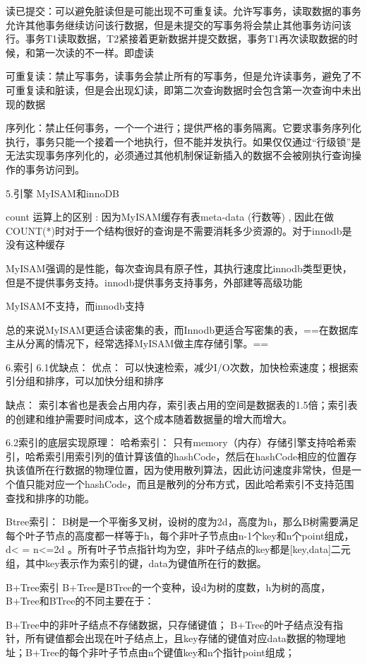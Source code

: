 \documentclass[UTF8]{ctexart}
\begin{document}
读已提交：可以避免脏读但是可能出现不可重复读。允许写事务，读取数据的事务允许其他事务继续访问该行数据，但是未提交的写事务将会禁止其他事务访问该行。事务T1读取数据，T2紧接着更新数据并提交数据，事务T1再次读取数据的时候，和第一次读的不一样。即虚读

可重复读：禁止写事务，读事务会禁止所有的写事务，但是允许读事务，避免了不可重复读和脏读，但是会出现幻读，即第二次查询数据时会包含第一次查询中未出现的数据

序列化：禁止任何事务，一个一个进行；提供严格的事务隔离。它要求事务序列化执行，事务只能一个接着一个地执行，但不能并发执行。如果仅仅通过“行级锁”是无法实现事务序列化的，必须通过其他机制保证新插入的数据不会被刚执行查询操作的事务访问到。

5.引擎
MyISAM和innoDB

count 运算上的区别 : 因为MyISAM缓存有表meta-data (行数等) , 因此在做COUNT(*)时对于一个结构很好的查询是不需要消耗多少资源的。对于innodb是没有这种缓存

MyISAM强调的是性能，每次查询具有原子性，其执行速度比innodb类型更快，但是不提供事务支持。innodb提供事务支持事务，外部建等高级功能

MyISAM不支持，而innodb支持

总的来说MyISAM更适合读密集的表，而Innodb更适合写密集的表，==在数据库主从分离的情况下，经常选择MyISAM做主库存储引擎。==

6.索引
6.1优缺点：
优点： 可以快速检索，减少I/O次数，加快检索速度；根据索引分组和排序，可以加快分组和排序

缺点： 索引本省也是表会占用内存，索引表占用的空间是数据表的1.5倍；索引表的创建和维护需要时间成本，这个成本随着数据量的增大而增大。

6.2索引的底层实现原理：
哈希索引：
只有memory（内存）存储引擎支持哈希索引，哈希索引用索引列的值计算该值的hashCode，然后在hashCode相应的位置存执该值所在行数据的物理位置，因为使用散列算法，因此访问速度非常快，但是一个值只能对应一个hashCode，而且是散列的分布方式，因此哈希索引不支持范围查找和排序的功能。

Btree索引：
B树是一个平衡多叉树，设树的度为2d，高度为h，那么B树需要满足每个叶子节点的高度都一样等于h，每个非叶子节点由n-1个key和n个point组成，d< = n<=2d 。所有叶子节点指针均为空，非叶子结点的key都是[key,data]二元组，其中key表示作为索引的键，data为键值所在行的数据。

B+Tree索引
B+Tree是BTree的一个变种，设d为树的度数，h为树的高度，B+Tree和BTree的不同主要在于：

B+Tree中的非叶子结点不存储数据，只存储键值；
B+Tree的叶子结点没有指针，所有键值都会出现在叶子结点上，且key存储的键值对应data数据的物理地址；B+Tree的每个非叶子节点由n个键值key和n个指针point组成；
\end{document}
